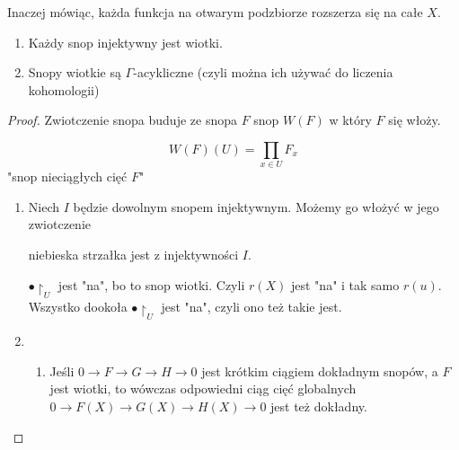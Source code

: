 Inaczej mówiąc, każda funkcja na otwarym podzbiorze rozszerza się na całe $X$.

\begin{theorem}
  \begin{enumerate}
    \item Każdy snop injektywny jest wiotki.
    \item Snopy wiotkie są $\Gamma$-acykliczne (czyli można ich używać do liczenia kohomologii)
  \end{enumerate}
\end{theorem}

\begin{proof}
  Zwiotczenie snopa buduje ze snopa $F$ snop $W(F)$ w który $F$ się włoży.

  \begin{definition}[zwiotczenie] 
    $$W(F)(U)=\prod_{x\in U}F_x$$
    "snop nieciągłych cięć $F$"
  \end{definition}

  \begin{enumerate}
    \item Niech $I$ będzie dowolnym snopem injektywnym. Możemy go włożyć w jego zwiotczenie 
      \begin{center}\end{center}
      niebieska strzałka jest z injektywności $I$.

      \begin{center}\end{center}
      $\bullet\restriction_U$ jest "na", bo to snop wiotki. Czyli $r(X)$ jest "na" i tak samo $r(u)$. Wszystko dookoła $\bullet\restriction_U$ jest "na", czyli ono też takie jest.

    \item 
      \begin{enumerate}
        \item Jeśli $0\to F\to G\to H\to 0$ jest krótkim ciągiem dokładnym snopów, a $F$ jest wiotki, to wówczas odpowiedni ciąg cięć globalnych $0\to F(X)\to G(X)\to H(X)\to 0$  jest też dokładny.


\end{enumerate}
\end{enumerate}
\end{proof}
